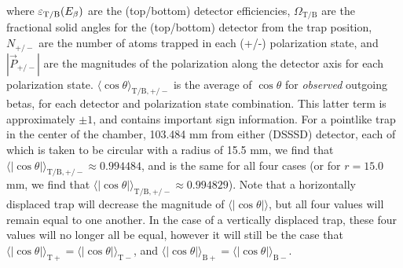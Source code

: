 where $\varepsilon_{\mathrm T / \mathrm B}(E_{\beta})$ are the (top/bottom) detector efficiencies, $\Omega_{\mathrm T / \mathrm B}$ are the fractional solid angles for the (top/bottom) detector from the trap position, $N_{+/-}$ are the number of atoms trapped in each (+/-) polarization state, and $|\vec{P}_{+/-}|$ are the magnitudes of the polarization along the detector axis for each polarization state.  $\langle \cos\theta \rangle_{\mathrm T/ \mathrm B, +/-} $ is the average of $\cos\theta$ for \emph{observed} outgoing betas, for each detector and polarization state combination.  This latter term is approximately $\pm 1$, and contains important sign information.  For a pointlike trap in the center of the chamber, 103.484 mm from either (DSSSD) detector, each of which is taken to be circular with a radius of 15.5 mm, we find that $\langle | \cos\theta | \rangle_{\mathrm T/ \mathrm B, +/-} \approx 0.994484$, and is the same for all four cases (or for $r=15.0$\,mm, we find that $\langle | \cos\theta | \rangle_{\mathrm T/ \mathrm B, +/-} \approx 0.994829$). Note that a horizontally displaced trap will decrease the magnitude of $\langle | \cos\theta | \rangle $, but all four values will remain equal to one another.  In the case of a vertically displaced trap, these four values will no longer all be equal, however it will still be the case that $\langle | \cos\theta | \rangle_{\mathrm T +} = \langle | \cos\theta | \rangle_{\mathrm T -}$, and $\langle | \cos\theta | \rangle_{\mathrm B+} = \langle | \cos\theta | \rangle_{\mathrm B -}$.

